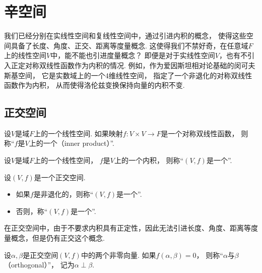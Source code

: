 \section{辛空间}
我们已经分别在实线性空间和复线性空间中，通过引进内积的概念，
使得这些空间具备了长度、角度、正交、距离等度量概念.
这使得我们不禁好奇，在任意域\(F\)上的线性空间\(V\)中，能不能也引进度量概念？
即便是对于实线性空间\(V\)，也有不引入正定对称双线性函数作为内积的情况.
例如，作为爱因斯坦相对论基础的闵可夫斯基空间，
它是实数域上的一个4维线性空间，
指定了一个非退化的对称双线性函数作为内积，
从而使得洛伦兹变换保持向量的内积不变.

\subsection{正交空间}
\begin{definition}
设\(V\)是域\(F\)上的一个线性空间.
如果映射\(f\colon V \times V \to F\)是一个对称双线性函数，
则称“\(f\)是\(V\)上的一个（inner product）”.
\end{definition}

\begin{definition}\label{definition:正交空间.正交空间}
设\(V\)是域\(F\)上的一个线性空间，
\(f\)是\(V\)上的一个内积，
则称“\((V,f)\)是一个”.
\end{definition}

\begin{definition}
设\((V,f)\)是一个正交空间.
\begin{itemize}
	\item 如果\(f\)是非退化的，则称“\((V,f)\)是一个”.
	\item 否则，称“\((V,f)\)是一个”.
\end{itemize}
\end{definition}

在正交空间中，由于不要求内积具有正定性，因此无法引进长度、角度、距离等度量概念，但是仍有正交这个概念.
\begin{definition}
设\(\alpha,\beta\)是正交空间\((V,f)\)中的两个非零向量.
如果\(f(\alpha,\beta) = 0\)，
则称“\(\alpha\)与\(\beta\) （orthogonal）”，
记为\(\alpha \perp \beta\).
\end{definition}

